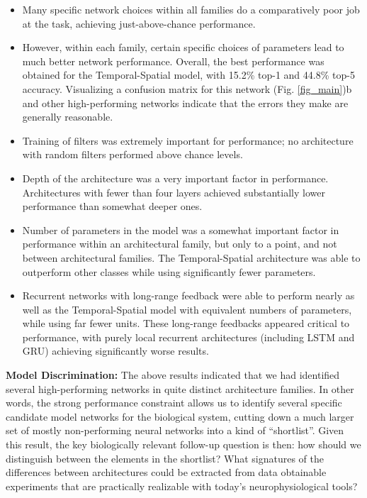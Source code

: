 \begin{itemize}[leftmargin=*,itemsep=0ex,topsep=1ex]
   \item Many specific network choices within all families do a comparatively poor job at the task, achieving just-above-chance performance.
   \item However, within each family, certain specific choices of parameters lead to much better network performance.
   Overall, the best performance was obtained for the Temporal-Spatial model, with 15.2\% top-1 and 44.8\% top-5 accuracy.
   Visualizing a confusion matrix for this network (Fig. \ref{fig_main})b  and other high-performing networks indicate that the errors they make are generally reasonable.
   \item Training of filters was extremely important for performance; no architecture with random filters performed above chance levels.
   \item Depth of the architecture was a very important factor in performance. Architectures with fewer than four layers achieved substantially lower performance than somewhat deeper ones.
   \item Number of parameters in the model was a somewhat important factor in performance within an architectural family, but only to a point, and not between architectural families.
   The Temporal-Spatial architecture was able to outperform other classes while using significantly fewer parameters.
   \item Recurrent networks with long-range feedback were able to perform nearly as well as the Temporal-Spatial model with equivalent numbers of parameters, while using far fewer units.
   These long-range feedbacks appeared critical to performance, with purely local recurrent architectures (including LSTM and GRU) achieving significantly worse results.
\end{itemize}

\textbf{Model Discrimination:}  The above results indicated that we had identified several high-performing networks in quite distinct architecture families.
In other words, the strong performance constraint allows us to identify several specific candidate model networks for the biological system, cutting down a much larger set of mostly non-performing neural networks into a kind of ``shortlist''.
Given this result, the key biologically relevant follow-up question is then: how should we distinguish between the elements in the shortlist?
What signatures of the differences between architectures could be extracted from data obtainable experiments that are practically realizable with today's neurophysiological tools?

